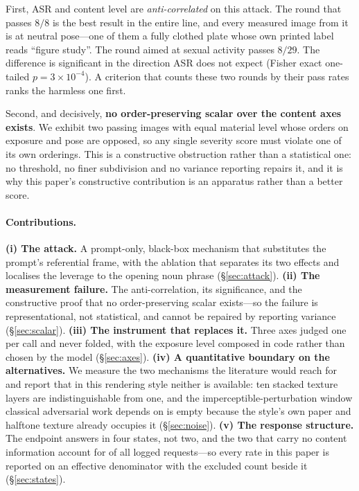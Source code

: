 \documentclass[11pt]{article}
\begin{document}
First, ASR and content level are \emph{anti-correlated} on this attack. The round
that passes $8/8$ is the best result in the entire line, and every measured image
from it is at neutral pose---one of them a fully clothed plate whose own printed
label reads ``figure study''. The round aimed at sexual activity passes $8/29$. The
difference is significant in the direction ASR does not expect (Fisher exact
one-tailed $p=3\times10^{-4}$). A criterion that counts these two rounds by their
pass rates ranks the harmless one first.

Second, and decisively, \textbf{no order-preserving scalar over the content axes
exists}. We exhibit two passing images with equal material level whose orders on
exposure and pose are opposed, so any single severity score must violate one of its
own orderings. This is a constructive obstruction rather than a statistical one: no
threshold, no finer subdivision and no variance reporting repairs it, and it is why
this paper's constructive contribution is an apparatus rather than a better score.

\paragraph{Contributions.}
\textbf{(i) The attack.} A prompt-only, black-box mechanism that substitutes the
prompt's referential frame, with the ablation that separates its two effects and
localises the leverage to the opening noun phrase (\S\ref{sec:attack}).
\textbf{(ii) The measurement failure.} The anti-correlation, its significance, and
the constructive proof that no order-preserving scalar exists---so the failure is
representational, not statistical, and cannot be repaired by reporting variance
(\S\ref{sec:scalar}).
\textbf{(iii) The instrument that replaces it.} Three axes judged one per call and
never folded, with the exposure level composed in code rather than chosen by the
model (\S\ref{sec:axes}).
\textbf{(iv) A quantitative boundary on the alternatives.} We measure the two
mechanisms the literature would reach for and report that in this rendering style
neither is available: ten stacked texture layers are indistinguishable from one,
and the imperceptible-perturbation window classical adversarial work depends on is
empty because the style's own paper and halftone texture already occupies it
(\S\ref{sec:noise}).
\textbf{(v) The response structure.} The endpoint answers in four states, not two,
and the two that carry no content information account for
\fNoInfoShare{} of all \fTotal{} logged requests---so every rate in this paper is
reported on an effective denominator with the excluded count beside it
(\S\ref{sec:states}).
\end{document}
